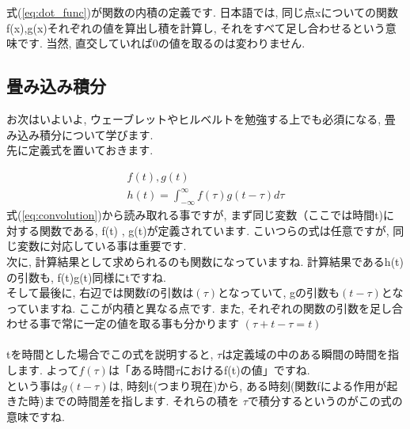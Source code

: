 \documentclass[11pt,a4paper]{ujreport}
\begin{document}
式(\ref{eq:dot_func})が関数の内積の定義です. 日本語では, 同じ点xについての関数f(x),g(x)それぞれの値を算出し積を計算し, それをすべて足し合わせるという意味です. 当然, 直交していれば0の値を取るのは変わりません.


\subsection{畳み込み積分 \label{convolution}}
お次はいよいよ, ウェーブレットやヒルベルトを勉強する上でも必須になる, 畳み込み積分について学びます.\\
先に定義式を置いておきます.

\begin{eqnarray}
\label{eq:convolution}
f(t) , g(t)\\
h(t) = \int^{\infty}_{-\infty} f(\tau) g(t - \tau) d\tau
\end{eqnarray}
式(\ref{eq:convolution})から読み取れる事ですが, まず同じ変数（ここでは時間t)に対する関数である, f(t) , g(t)が定義されています. こいつらの式は任意ですが, 同じ変数に対応している事は重要です. \\
次に, 計算結果として求められるのも関数になっていますね. 計算結果であるh(t)の引数も, f(t)g(t)同様にtですね.\\
そして最後に, 右辺では関数fの引数は$(\tau)$となっていて, gの引数も$(t - \tau)$となっていますね. ここが内積と異なる点です. また, それぞれの関数の引数を足し合わせる事で常に一定の値を取る事も分かります $(\tau + t - \tau = t)$\\
\\
tを時間とした場合でこの式を説明すると, $\tau$は定義域の中のある瞬間の時間を指します. よって$f(\tau)$は「ある時間$\tau$におけるf(t)の値」ですね.\\
という事は$g(t-\tau)$は, 時刻t(つまり現在)から, ある時刻(関数fによる作用が起きた時)までの時間差を指します. それらの積を $\tau$で積分するというのがこの式の意味ですね.\\
\\
\\
\end{document}
